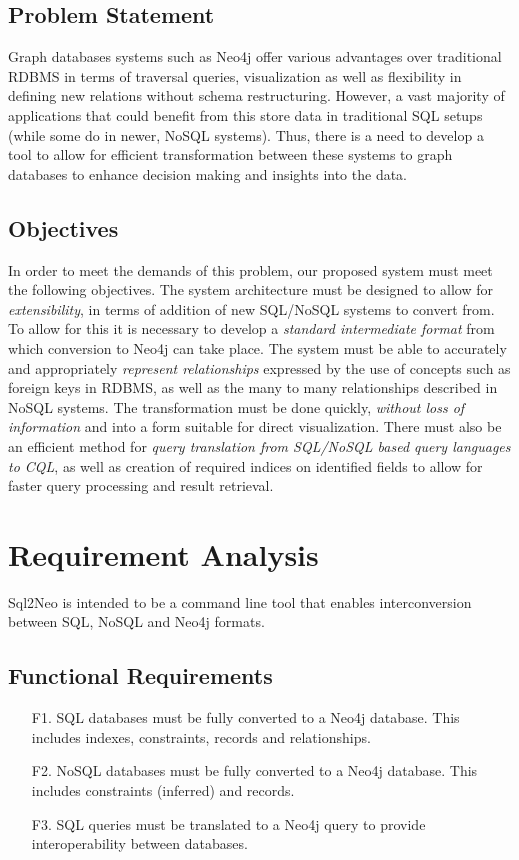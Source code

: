 \documentclass[12pt]{article}
\newcommand{\sectionfontstyle}{\fontsize{16pt}{1em}\usefont{T1}{phv}{b}{n}}
\begin{document}
    \subsection{Problem Statement}
    Graph databases systems such as Neo4j offer various advantages over traditional RDBMS in terms of traversal queries, visualization as well as flexibility in defining new relations without schema restructuring. However, a vast majority of applications that could benefit from this store data in traditional SQL setups (while some do in newer, NoSQL systems). Thus, there is a need to develop a tool to allow for efficient transformation between these systems to graph databases to enhance decision making and insights into the data.

    \subsection{Objectives}
    In order to meet the demands of this problem, our proposed system must meet the following objectives. The system architecture must be designed to allow for \textit{extensibility}, in terms of addition of new SQL/NoSQL systems to convert from. To allow for this it is necessary to develop a \textit{standard intermediate format} from which conversion to Neo4j can take place. The system must be able to accurately and appropriately \textit{represent relationships} expressed by the use of concepts such as foreign keys in RDBMS, as well as the many to many relationships described in NoSQL systems. The transformation must be done quickly, \textit{without loss of information} and into a form suitable for direct visualization. There must also be an efficient method for \textit{query translation from SQL/NoSQL based query languages to CQL}, as well as creation of required indices on identified fields to allow for faster query processing and result retrieval.

    \newpage

    \section{\sectionfontstyle Requirement Analysis}
    Sql2Neo is intended to be a command line tool that enables interconversion between SQL, NoSQL and Neo4j formats.

    \subsection{Functional Requirements}
    \begin{enumerate}
        \item [F1.] SQL databases must be fully converted to a Neo4j database. This includes indexes, constraints, records and relationships.
        \item [F2.] NoSQL databases must be fully converted to a Neo4j database. This includes constraints (inferred) and records.
        \item [F3.] SQL queries must be translated to a Neo4j query to provide interoperability between databases.
    \end{enumerate}
\end{document}
